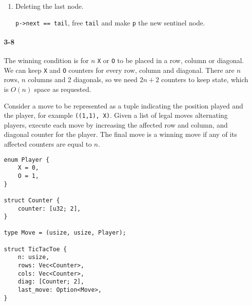 \documentclass{report}
\begin{document}
\begin{enumerate}[label=\arabic*)]
    \item Deleting the last node.

    \begin{center}
    \end{center}

    \lstinline!p->next == tail!, free \lstinline!tail! and make \lstinline!p! the new sentinel node.

	\begin{center}
    \end{center}
\end{enumerate}

\paragraph{3-8} The winning condition is for $n$ \lstinline!X! or \lstinline!O! to be placed in a row, column or diagonal. We can keep \lstinline!X! and \lstinline!O! counters for every row, column and diagonal. There are $n$ rows, $n$ columns and 2 diagonals, so we need $2n+2$ counters to keep state, which is $O(n)$ space as requested.

Consider a move to be represented as a tuple indicating the position played and the player, for example \lstinline!((1,1), X)!. Given a list of legal moves alternating players, execute each move by increasing the affected row and column, and diagonal counter for the player. The final move is a winning move if any of its affected counters are equal to $n$.

\begin{lstlisting}
enum Player {
    X = 0,
    O = 1,
}

struct Counter {
    counter: [u32; 2],
}

type Move = (usize, usize, Player);

struct TicTacToe {
    n: usize,
    rows: Vec<Counter>,
    cols: Vec<Counter>,
    diag: [Counter; 2],
    last_move: Option<Move>,
}
\end{lstlisting}
\end{document}
